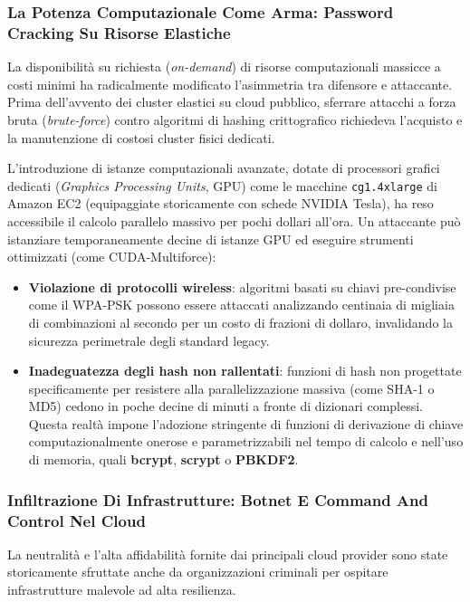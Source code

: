 \documentclass[11pt, a4paper]{article}
\begin{document}
\subsubsection{La Potenza Computazionale Come Arma: Password Cracking Su Risorse Elastiche}
La disponibilità su richiesta (\emph{on-demand}) di risorse computazionali massicce a costi minimi ha radicalmente modificato l'asimmetria tra difensore e attaccante. Prima dell'avvento dei cluster elastici su cloud pubblico, sferrare attacchi a forza bruta (\emph{brute-force}) contro algoritmi di hashing crittografico richiedeva l'acquisto e la manutenzione di costosi cluster fisici dedicati.


L'introduzione di istanze computazionali avanzate, dotate di processori grafici dedicati (\emph{Graphics Processing Units}, GPU) come le macchine \texttt{cg1.4xlarge} di Amazon EC2 (equipaggiate storicamente con schede NVIDIA Tesla), ha reso accessibile il calcolo parallelo massivo per pochi dollari all'ora. Un attaccante può istanziare temporaneamente decine di istanze GPU ed eseguire strumenti ottimizzati (come CUDA-Multiforce):
\begin{itemize}
    \item \textbf{Violazione di protocolli wireless}: algoritmi basati su chiavi pre-condivise come il WPA-PSK possono essere attaccati analizzando centinaia di migliaia di combinazioni al secondo per un costo di frazioni di dollaro, invalidando la sicurezza perimetrale degli standard legacy.
    \item \textbf{Inadeguatezza degli hash non rallentati}: funzioni di hash non progettate specificamente per resistere alla parallelizzazione massiva (come SHA-1 o MD5) cedono in poche decine di minuti a fronte di dizionari complessi. Questa realtà impone l'adozione stringente di funzioni di derivazione di chiave computazionalmente onerose e parametrizzabili nel tempo di calcolo e nell'uso di memoria, quali \textbf{bcrypt}, \textbf{scrypt} o \textbf{PBKDF2}.
\end{itemize}

\subsubsection{Infiltrazione Di Infrastrutture: Botnet E Command And Control Nel Cloud}
La neutralità e l'alta affidabilità fornite dai principali cloud provider sono state storicamente sfruttate anche da organizzazioni criminali per ospitare infrastrutture malevole ad alta resilienza.
\end{document}
